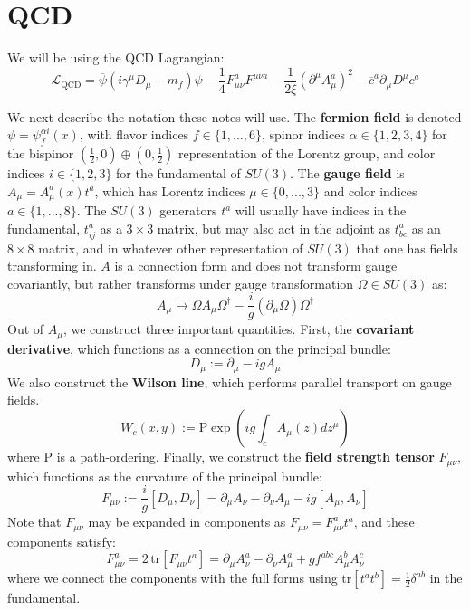 \documentclass[11pt, oneside]{article}   	%
\theoremstyle{definition}
\numberwithin{equation}{subsection}		%
\begin{document}
\newpage
\section{QCD}

We will be using the QCD Lagrangian:
\begin{equation}
	\mathcal{L}_\mathrm{QCD} = \overline\psi(i\gamma^\mu D_\mu - m_f)\psi - \frac{1}{4} F_{\mu\nu}^a F^{\mu\nu a} 
	- \frac{1}{2\xi} (\partial^\mu A_\mu^a)^2 - \overline c^a \partial_\mu D^\mu c^a
\end{equation}

We next describe the notation these notes will use. The \textbf{fermion field}  is denoted $\psi = \psi_f^{\alpha i}(x)$, with flavor 
indices $f\in \{1, ..., 6\}$, spinor indices $\alpha\in \{1, 2, 3, 4\}$ for the bispinor $(\frac{1}{2}, 0)\oplus (0, \frac{1}{2})$ 
representation of the Lorentz group, and color indices $i\in \{1, 2, 3\}$ for the fundamental of $SU(3)$. The 
\textbf{gauge field} is $A_\mu = A_\mu^a(x) t^a$, which has Lorentz indices $\mu\in \{0, ..., 3\}$ and color indices 
$a\in \{1, ..., 8\}$. The $SU(3)$ generators $t^a$ will usually have indices in the fundamental, $t^a_{ij}$ as a $3\times 3$ 
matrix, but may also act in the adjoint as $t^a_{bc}$ as an $8\times 8$ matrix, and in whatever other representation of $SU(3)$ 
that one has fields transforming in. $A$ is a connection form and does not transform gauge covariantly, but rather transforms 
under gauge transformation $\Omega\in SU(3)$ as:
\begin{equation}
	A_\mu\mapsto \Omega A_\mu \Omega^\dagger - \frac{i}{g}(\partial_\mu \Omega) \Omega^\dagger
\end{equation}
Out of $A_\mu$, we construct three important quantities. First, the \textbf{covariant derivative}, which functions as a connection 
on the principal bundle:
\begin{equation}
	D_\mu := \partial_\mu - i g A_\mu
\end{equation}
We also construct the \textbf{Wilson line}, which performs parallel transport on gauge fields.
\begin{equation}
	W_c(x, y) := \mathrm{P}\exp \left(ig \int_c A_\mu(z) dz^\mu\right)
\end{equation}
where $\mathrm{P}$ is a path-ordering. Finally, we construct the \textbf{field strength tensor} $F_{\mu\nu}$, which functions 
as the curvature of the principal bundle:
\begin{equation}
	F_{\mu\nu} := \frac{i}{g}[D_\mu, D_\nu] = \partial_\mu A_\nu - \partial_\nu A_\mu - ig [A_\mu, A_\nu]
\end{equation}
Note that $F_{\mu\nu}$ may be expanded in components as $F_{\mu\nu} = F_{\mu\nu}^a t^a$, and these components 
satisfy:
\begin{equation}
	F_{\mu\nu}^a = 2\,\mathrm{tr}\left[F_{\mu\nu} t^a\right] = \partial_\mu A_\nu^a - \partial_\nu A_\mu^a + g f^{abc} A_\mu^b A_\nu^c
\end{equation}
where we connect the components with the full forms using $\mathrm{tr}[t^at^b] = \frac{1}{2}\delta^{ab}$ in the fundamental. 
\end{document}
